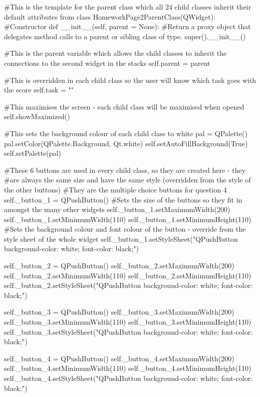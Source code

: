 \begin{landscape}
\begin{python}
#This is the template for the parent class which all 24 child classes inherit their default attributes from
class HomeworkPage2ParentClass(QWidget):
    #Constructor
    def __init__(self, parent = None):
        #Return a proxy object that delegates method calls to a parent or sibling class of type.
        super().__init__()

        #This is the parent variable which allows the child classes to inherit the connections to the second widget in the stacks
        self.parent = parent

        #This is overridden in each child class so the user will know which task goes with the score
        self.task = ""

        #This maximises the screen - each child class will be maximised when opened
        self.showMaximized()

        #This sets the background colour of each child class to white
        pal = QPalette()
        pal.setColor(QPalette.Background, Qt.white)
        self.setAutoFillBackground(True)
        self.setPalette(pal)

        #These 6 buttons are used in every child class, so they are created here - they
        #are always the same size and have the same style (overridden from the style of the other buttons)
        #They are the multiple choice buttons for question 4
        self._button_1 = QPushButton()
        #Sets the size of the buttons so they fit in amongst the many other widgets
        self._button_1.setMaximumWidth(200)
        self._button_1.setMinimumWidth(110)
        self._button_1.setMinimumHeight(110)
        #Sets the background colour and font colour of the button - override from the style sheet of the whole widget
        self._button_1.setStyleSheet("QPushButton {background-color: white; font-color: black;}")
        
        self._button_2 = QPushButton()
        self._button_2.setMaximumWidth(200)
        self._button_2.setMinimumWidth(110)
        self._button_2.setMinimumHeight(110)
        self._button_2.setStyleSheet("QPushButton {background-color: white; font-color: black;}")
  
        self._button_3 = QPushButton()
        self._button_3.setMaximumWidth(200)
        self._button_3.setMinimumWidth(110)
        self._button_3.setMinimumHeight(110)
        self._button_3.setStyleSheet("QPushButton {background-color: white; font-color: black;}")
        
        self._button_4 = QPushButton()
        self._button_4.setMaximumWidth(200)
        self._button_4.setMinimumWidth(110)
        self._button_4.setMinimumHeight(110)
        self._button_4.setStyleSheet("QPushButton {background-color: white; font-color: black;}")
        

\end{python}
\end{landscape}
